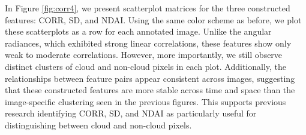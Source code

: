 \documentclass[10pt,letterpaper]{article}
\begin{document}
In Figure \ref{fig:corr4}, we present scatterplot matrices for the three constructed features: CORR, SD, and NDAI. Using the same color scheme as before, we plot these scatterplots as a row for each annotated image. Unlike the angular radiances, which exhibited strong linear correlations, these features show only weak to moderate correlations. However, more importantly, we still observe distinct clusters of cloud and non-cloud pixels in each plot. Additionally, the relationships between feature pairs appear consistent across images, suggesting that these constructed features are more stable across time and space than the image-specific clustering seen in the previous figures. This supports previous research identifying CORR, SD, and NDAI as particularly useful for distinguishing between cloud and non-cloud pixels.
\end{document}
